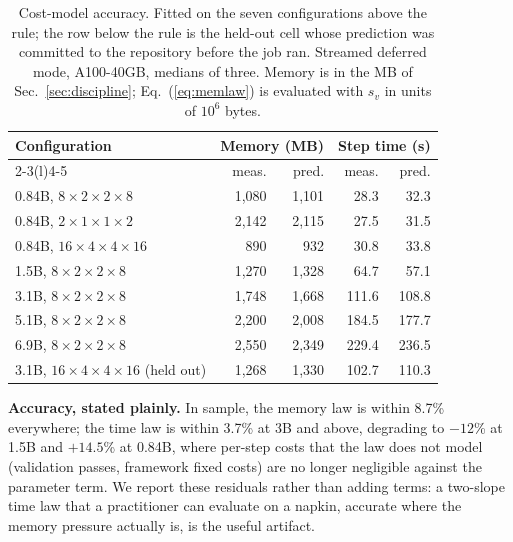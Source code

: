 \documentclass[journal]{IEEEtran}
\begin{document}
\begin{table}[t]
\caption{Cost-model accuracy. Fitted on the seven configurations above the
rule; the row below the rule is the held-out cell whose prediction was
committed to the repository before the job ran. Streamed deferred mode,
A100-40GB, medians of three. Memory is in the MB of Sec.~\ref{sec:discipline};
Eq.~(\ref{eq:memlaw}) is evaluated with $s_v$ in units of $10^6$ bytes.}
\label{tab:costmodel}
\centering
\small
\begin{tabular}{@{}lrrrr@{}}
\toprule
Configuration & \multicolumn{2}{c}{Memory (MB)} & \multicolumn{2}{c}{Step time (s)} \\
\cmidrule(lr){2-3}\cmidrule(l){4-5}
 & meas. & pred. & meas. & pred. \\
\midrule
0.84B, $8{\times}2{\times}2{\times}8$ & 1{,}080 & 1{,}101 & 28.3 & 32.3 \\
0.84B, $2{\times}1{\times}1{\times}2$ & 2{,}142 & 2{,}115 & 27.5 & 31.5 \\
0.84B, $16{\times}4{\times}4{\times}16$ & 890 & 932 & 30.8 & 33.8 \\
1.5B, $8{\times}2{\times}2{\times}8$ & 1{,}270 & 1{,}328 & 64.7 & 57.1 \\
3.1B, $8{\times}2{\times}2{\times}8$ & 1{,}748 & 1{,}668 & 111.6 & 108.8 \\
5.1B, $8{\times}2{\times}2{\times}8$ & 2{,}200 & 2{,}008 & 184.5 & 177.7 \\
6.9B, $8{\times}2{\times}2{\times}8$ & 2{,}550 & 2{,}349 & 229.4 & 236.5 \\
\midrule
3.1B, $16{\times}4{\times}4{\times}16$ (held out) & 1{,}268 & 1{,}330 & 102.7 & 110.3 \\
\bottomrule
\end{tabular}
\end{table}

\textbf{Accuracy, stated plainly.} In sample, the memory law is within
8.7\% everywhere; the time law is within 3.7\% at 3B and above, degrading
to $-12$\% at 1.5B and $+14.5$\% at 0.84B, where per-step costs that the law
does not model (validation passes, framework fixed costs) are no longer
negligible against the parameter term. We report these residuals rather
than adding terms: a two-slope time law that a practitioner can
evaluate on a napkin, accurate where the memory pressure actually is, is
the useful artifact.
\end{document}
